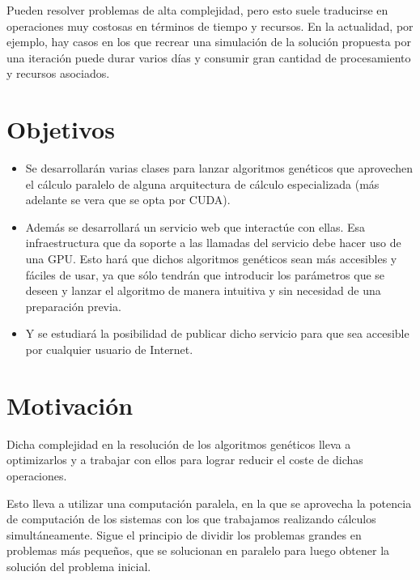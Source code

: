 \bigskip
Pueden resolver problemas de alta complejidad, pero esto suele traducirse en operaciones muy costosas en términos de tiempo y recursos. En la actualidad, por ejemplo, hay casos en los que recrear una simulación de la solución propuesta por una iteración puede durar varios días y consumir gran cantidad de procesamiento y recursos asociados.





\bigskip
\section{Objetivos}
\bigskip


\begin{itemize}
	
	\item Se desarrollarán varias clases para lanzar algoritmos genéticos que aprovechen el cálculo paralelo de alguna arquitectura de cálculo especializada (más adelante se vera que se opta por CUDA).
	
	\item Además se desarrollará un servicio web que interactúe con ellas. Esa infraestructura que da soporte a las llamadas del servicio debe hacer uso de una GPU. Esto hará que dichos algoritmos genéticos sean más accesibles y fáciles de usar, ya que sólo tendrán que introducir los parámetros que se deseen y lanzar el algoritmo de manera intuitiva y sin necesidad de una preparación previa.
	
	\item Y se estudiará la posibilidad de publicar dicho servicio para que sea accesible por cualquier usuario de Internet.
	
\end{itemize}



\bigskip
\section{Motivación}
\bigskip

Dicha complejidad en la resolución de los algoritmos genéticos lleva a optimizarlos y a trabajar con ellos para lograr reducir el coste de dichas operaciones. 

Esto lleva a utilizar una computación paralela, en la que se aprovecha la potencia de computación de los sistemas con los que trabajamos realizando cálculos simultáneamente. Sigue el principio de dividir los problemas grandes en problemas más pequeños, que se solucionan en paralelo para luego obtener la solución del problema inicial.

